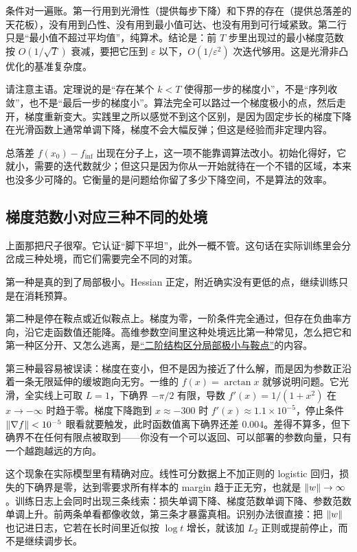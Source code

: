 条件对一遍账。第一行用到光滑性（提供每步下降）和下界的存在（提供总落差的天花板），没有用到凸性、没有用到最小值可达、也没有用到可行域紧致。第二行只是``最小值不超过平均值''，纯算术。结论是：前 \(T\) 步里出现过的最小梯度范数按 \(O(1/\sqrt{T})\) 衰减，要把它压到 \(\varepsilon\) 以下，\(O(1/\varepsilon^2)\) 次迭代够用。这是光滑非凸优化的基准复杂度。

请注意主语。定理说的是``存在某个 \(k<T\) 使得那一步的梯度小''，不是``序列收敛''，也不是``最后一步的梯度小''。算法完全可以路过一个梯度极小的点，然后走开，梯度重新变大。实践里之所以感觉不到这个区别，是因为固定步长的梯度下降在光滑函数上通常单调下降，梯度不会大幅反弹；但这是经验而非定理内容。

总落差 \(f(x_0)-f_{\inf}\) 出现在分子上，这一项不能靠调算法改小。初始化得好，它就小，需要的迭代数就少；但这只是因为你从一开始就待在一个不错的区域，本来也没多少可降的。它衡量的是问题给你留了多少下降空间，不是算法的效率。

\subsection{梯度范数小对应三种不同的处境}

上面那把尺子很窄。它认证``脚下平坦''，此外一概不管。这句话在实际训练里会分岔成三种处境，而它们需要完全不同的对策。

第一种是真的到了局部极小。Hessian 正定，附近确实没有更低的点，继续训练只是在消耗预算。

第二种是停在鞍点或近似鞍点上。梯度为零，一阶条件完全通过，但存在负曲率方向，沿它走函数值还能降。高维参数空间里这种处境远比第一种常见，怎么把它和第一种区分开、又怎么逃离，是\hyperref[sec:09-Convex-Optimization/08-Nonconvex-and-Stochastic-Optimization/02]{``二阶结构区分局部极小与鞍点''}的内容。

第三种最容易被误读：梯度在变小，但不是因为接近了什么解，而是因为参数正沿着一条无限延伸的缓坡跑向无穷。一维的 \(f(x)=\arctan x\) 就够说明问题。它光滑，全实线上可取 \(L=1\)，下确界 \(-\pi/2\) 有限，导数 \(f'(x)=1/(1+x^2)\) 在 \(x\to-\infty\) 时趋于零。梯度下降跑到 \(x\approx-300\) 时 \(f'(x)\approx1.1\times10^{-5}\)，停止条件 \(\left\lVert\nabla f\right\rVert<10^{-5}\) 眼看就要触发，此时函数值离下确界还差 \(0.004\)。差得不算多，但下确界不在任何有限点被取到——你没有一个可以返回、可以部署的参数向量，只有一个越跑越远的方向。

这个现象在实际模型里有精确对应。线性可分数据上不加正则的 logistic 回归，损失的下确界是零，达到零要求所有样本的 margin 趋于正无穷，也就是 \(\left\lVert w\right\rVert\to\infty\)。训练日志上会同时出现三条线索：损失单调下降、梯度范数单调下降、参数范数单调上升。前两条单看都像收敛，第三条才暴露真相。识别办法很直接：把 \(\left\lVert w\right\rVert\) 也记进日志，它若在长时间里近似按 \(\log t\) 增长，就该加 \(L_2\) 正则或提前停止，而不是继续调步长。

